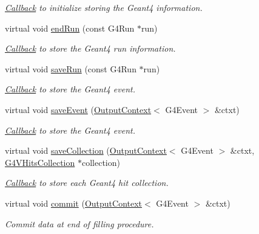 \begin{DoxyCompactItemize}
\begin{DoxyCompactList}\small\item\em \hyperlink{class_d_d4hep_1_1_callback}{Callback} to initialize storing the Geant4 information. \end{DoxyCompactList}\item 
virtual void \hyperlink{class_d_d4hep_1_1_simulation_1_1_geant4_output_action_ac89540100411ccec1804da9afbb843a4}{end\+Run} (const G4\+Run $\ast$run)
\begin{DoxyCompactList}\small\item\em \hyperlink{class_d_d4hep_1_1_callback}{Callback} to store the Geant4 run information. \end{DoxyCompactList}\item 
virtual void \hyperlink{class_d_d4hep_1_1_simulation_1_1_geant4_output_action_a4016b3e0ee787a3ac3d1fcd7a4c84a68}{save\+Run} (const G4\+Run $\ast$run)
\begin{DoxyCompactList}\small\item\em \hyperlink{class_d_d4hep_1_1_callback}{Callback} to store the Geant4 event. \end{DoxyCompactList}\item 
virtual void \hyperlink{class_d_d4hep_1_1_simulation_1_1_geant4_output_action_a660080e931d757573839927ca99bfbed}{save\+Event} (\hyperlink{class_d_d4hep_1_1_simulation_1_1_geant4_output_action_1_1_output_context}{Output\+Context}$<$ G4\+Event $>$ \&ctxt)
\begin{DoxyCompactList}\small\item\em \hyperlink{class_d_d4hep_1_1_callback}{Callback} to store the Geant4 event. \end{DoxyCompactList}\item 
virtual void \hyperlink{class_d_d4hep_1_1_simulation_1_1_geant4_output_action_aa43d1f01dbcb11ac1d937a878d87a90f}{save\+Collection} (\hyperlink{class_d_d4hep_1_1_simulation_1_1_geant4_output_action_1_1_output_context}{Output\+Context}$<$ G4\+Event $>$ \&ctxt, \hyperlink{class_g4_v_hits_collection}{G4\+V\+Hits\+Collection} $\ast$collection)
\begin{DoxyCompactList}\small\item\em \hyperlink{class_d_d4hep_1_1_callback}{Callback} to store each Geant4 hit collection. \end{DoxyCompactList}\item 
virtual void \hyperlink{class_d_d4hep_1_1_simulation_1_1_geant4_output_action_a1d83299b79de6a1a75e70ef5a9e4d3eb}{commit} (\hyperlink{class_d_d4hep_1_1_simulation_1_1_geant4_output_action_1_1_output_context}{Output\+Context}$<$ G4\+Event $>$ \&ctxt)
\begin{DoxyCompactList}\small\item\em Commit data at end of filling procedure. \end{DoxyCompactList}\end{DoxyCompactItemize}
